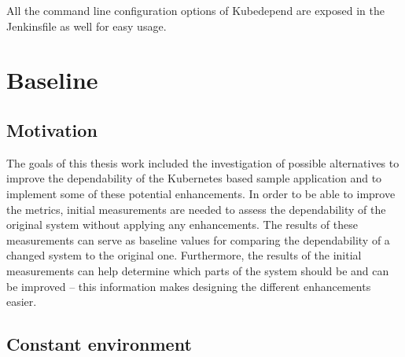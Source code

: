 All the command line configuration options of Kubedepend are exposed in the Jenkinsfile as well for easy usage.


\section{Baseline}



\subsection{Motivation}

The goals of this thesis work included the investigation of possible alternatives to improve the dependability of the Kubernetes based sample application and to implement some of these potential enhancements. In order to be able to improve the metrics, initial measurements are needed to assess the dependability of the original system without applying any enhancements. The results of these measurements can serve as baseline values for comparing the dependability of a changed system to the original one. Furthermore, the results of the initial measurements can help determine which parts of the system should be and can be improved -- this information makes designing the different enhancements easier.

\subsection{Constant environment}

